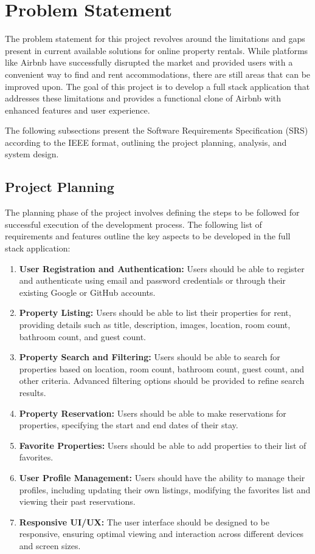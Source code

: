 \chapter{Problem Statement}

The problem statement for this project revolves around the limitations and gaps present in current available solutions for online property rentals. While platforms like Airbnb have successfully disrupted the market and provided users with a convenient way to find and rent accommodations, there are still areas that can be improved upon. The goal of this project is to develop a full stack application that addresses these limitations and provides a functional clone of Airbnb with enhanced features and user experience.

The following subsections present the Software Requirements Specification (SRS) according to the IEEE format, outlining the project planning, analysis, and system design.

\section{Project Planning}
The planning phase of the project involves defining the steps to be followed for successful execution of the development process. The following list of requirements and features outline the key aspects to be developed in the full stack application:

\begin{enumerate}
	\item \textbf{User Registration and Authentication:} Users should be able to register and authenticate using email and password credentials or through their existing Google or GitHub accounts.
	\item \textbf{Property Listing:} Users should be able to list their properties for rent, providing details such as title, description, images, location, room count, bathroom count, and guest count.
	\item \textbf{Property Search and Filtering:} Users should be able to search for properties based on location, room count, bathroom count, guest count, and other criteria. Advanced filtering options should be provided to refine search results.
	\item \textbf{Property Reservation:} Users should be able to make reservations for properties, specifying the start and end dates of their stay.
	\item \textbf{Favorite Properties: } Users should be able to add properties to their list of favorites.
	\item \textbf{User Profile Management:} Users should have the ability to manage their profiles, including updating their own listings, modifying the favorites list and viewing their past reservations.
	\item \textbf{Responsive UI/UX:} The user interface should be designed to be responsive, ensuring optimal viewing and interaction across different devices and screen sizes.
\end{enumerate}

